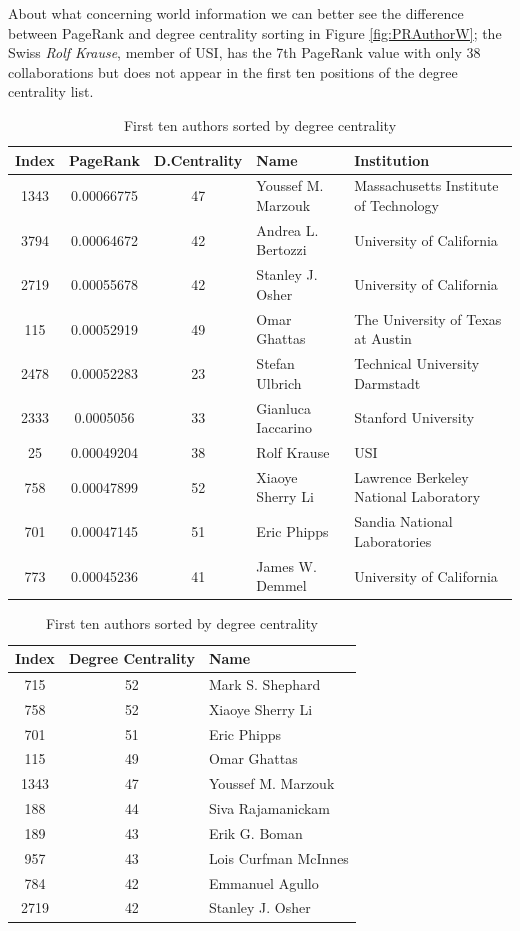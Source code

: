 \documentclass[]{usiinfbachelorproject}
\begin{document}
About what concerning world information we can better see the difference between PageRank and degree centrality sorting in Figure \ref{fig:PRAuthorW}; the Swiss  \textit{Rolf Krause}, member of USI, has the 7th PageRank value with only 38 collaborations but does not appear in the first ten positions of the degree centrality list.

\begin{table}[h!]
\begin{minipage}[b]{.55\linewidth}
\tiny
\begin{tabular*}{\textwidth}{c c c l l}
\textbf{Index} & \textbf{PageRank} & \textbf{D.Centrality} & \textbf{Name} & \textbf{Institution}\\
\hline
1343 & 0.00066775 & 47 & Youssef M. Marzouk & Massachusetts Institute of Technology \\
3794 & 0.00064672 & 42 & Andrea L. Bertozzi & University of California \\
2719 & 0.00055678 & 42 & Stanley J. Osher & University of California \\
115 & 0.00052919 & 49 & Omar Ghattas & The University of Texas at Austin \\
2478 & 0.00052283 & 23 & Stefan Ulbrich & Technical University Darmstadt \\
2333 & 0.0005056 & 33 & Gianluca Iaccarino & Stanford University \\
25 & 0.00049204 & 38 & Rolf Krause & USI \\
758 & 0.00047899 & 52 & Xiaoye Sherry Li & Lawrence Berkeley National Laboratory \\
701 & 0.00047145 & 51 & Eric Phipps & Sandia National Laboratories \\
773 & 0.00045236 & 41 & James W. Demmel& University of California
\end{tabular*}
\label{table:PR}
\caption{First ten authors \\ sorted by PageRank}
\end{minipage}
\begin{minipage}[b]{.4\linewidth}
\tiny
\raggedleft
\begin{tabular}{c c l}
\textbf{Index} & \textbf{Degree Centrality} & \textbf{Name} \\
\hline
715& 52 & Mark S. Shephard \\
758 & 52 & Xiaoye Sherry Li \\
701 & 51 & Eric Phipps\\
115 &49 & Omar Ghattas \\
1343 & 47 & Youssef M. Marzouk\\
188 & 44 & Siva Rajamanickam\\
189 & 43 & Erik G. Boman\\
957 & 43 & Lois Curfman McInnes\\
784 & 42 & Emmanuel Agullo \\
2719 & 42 & Stanley J. Osher
\end{tabular}
\label{table:DC}
\caption{First ten authors sorted by degree centrality}
\end{minipage}
\end{table}
\end{document}
